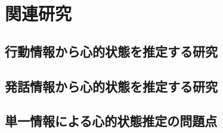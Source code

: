 \chapter{関連研究}
\section{行動情報から心的状態を推定する研究}


\section{発話情報から心的状態を推定する研究}


\section{単一情報による心的状態推定の問題点}
